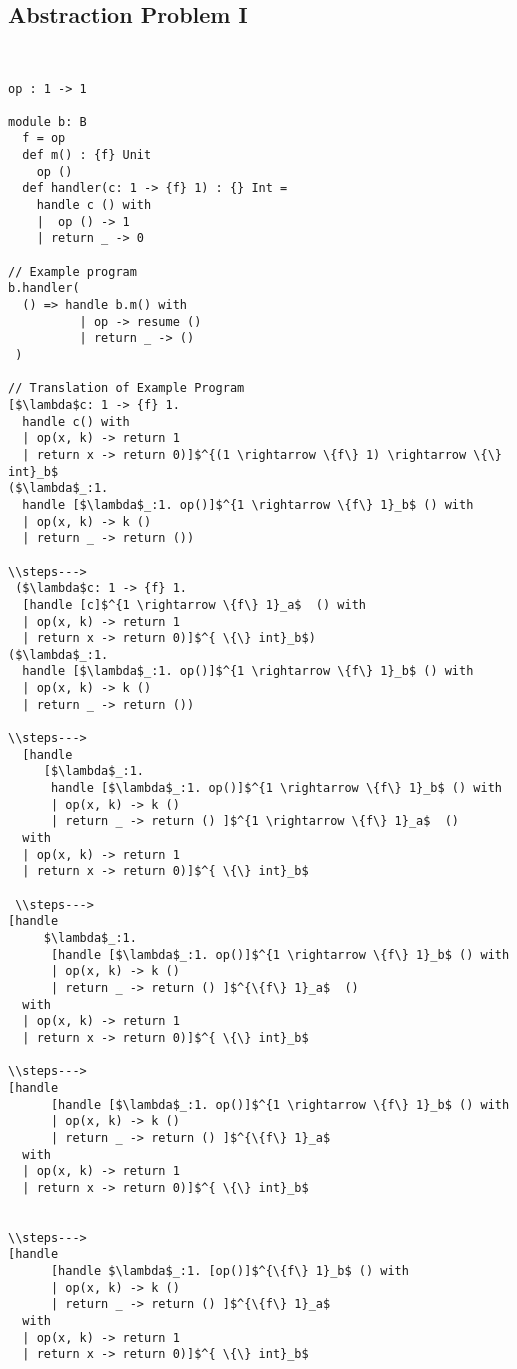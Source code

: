 \documentclass{article}
\theoremstyle{definition}
\begin{document}
\subsection{Abstraction Problem I}
\begin{lstlisting}


op : 1 -> 1
  
module b: B
  f = op
  def m() : {f} Unit
    op ()
  def handler(c: 1 -> {f} 1) : {} Int = 
    handle c () with
    |  op () -> 1
    | return _ -> 0

// Example program
b.handler(
  () => handle b.m() with
          | op -> resume ()
          | return _ -> ()
 )

// Translation of Example Program
[$\lambda$c: 1 -> {f} 1. 
  handle c() with 
  | op(x, k) -> return 1
  | return x -> return 0)]$^{(1 \rightarrow \{f\} 1) \rightarrow \{\} int}_b$
($\lambda$_:1. 
  handle [$\lambda$_:1. op()]$^{1 \rightarrow \{f\} 1}_b$ () with
  | op(x, k) -> k ()
  | return _ -> return ())
  
\\steps--->
 ($\lambda$c: 1 -> {f} 1. 
  [handle [c]$^{1 \rightarrow \{f\} 1}_a$  () with 
  | op(x, k) -> return 1
  | return x -> return 0)]$^{ \{\} int}_b$)
($\lambda$_:1. 
  handle [$\lambda$_:1. op()]$^{1 \rightarrow \{f\} 1}_b$ () with
  | op(x, k) -> k ()
  | return _ -> return ())
  
\\steps--->
  [handle 
     [$\lambda$_:1. 
      handle [$\lambda$_:1. op()]$^{1 \rightarrow \{f\} 1}_b$ () with
      | op(x, k) -> k ()
      | return _ -> return () ]$^{1 \rightarrow \{f\} 1}_a$  () 
  with 
  | op(x, k) -> return 1
  | return x -> return 0)]$^{ \{\} int}_b$
 
 \\steps--->
[handle 
     $\lambda$_:1. 
      [handle [$\lambda$_:1. op()]$^{1 \rightarrow \{f\} 1}_b$ () with
      | op(x, k) -> k ()
      | return _ -> return () ]$^{\{f\} 1}_a$  () 
  with 
  | op(x, k) -> return 1
  | return x -> return 0)]$^{ \{\} int}_b$
  
\\steps--->
[handle 
      [handle [$\lambda$_:1. op()]$^{1 \rightarrow \{f\} 1}_b$ () with
      | op(x, k) -> k ()
      | return _ -> return () ]$^{\{f\} 1}_a$ 
  with 
  | op(x, k) -> return 1
  | return x -> return 0)]$^{ \{\} int}_b$
  

\\steps--->
[handle 
      [handle $\lambda$_:1. [op()]$^{\{f\} 1}_b$ () with
      | op(x, k) -> k ()
      | return _ -> return () ]$^{\{f\} 1}_a$ 
  with 
  | op(x, k) -> return 1
  | return x -> return 0)]$^{ \{\} int}_b$
  

\end{lstlisting}
\end{document}
